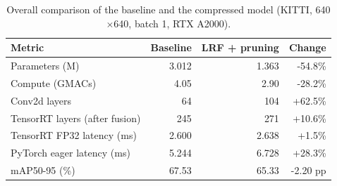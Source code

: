 \begin{table}[t]
\centering
\caption{Overall comparison of the baseline and the compressed model (KITTI, 640$\times$640, batch 1, RTX A2000).}
\label{tab:lrf_overall}
\begin{tabular}{lrrr}
\toprule
Metric & Baseline & LRF + pruning & Change \\
\midrule
Parameters (M) & 3.012 & 1.363 & -54.8\% \\
Compute (GMACs) & 4.05 & 2.90 & -28.2\% \\
Conv2d layers & 64 & 104 & +62.5\% \\
TensorRT layers (after fusion) & 245 & 271 & +10.6\% \\
TensorRT FP32 latency (ms) & 2.600 & 2.638 & +1.5\% \\
PyTorch eager latency (ms) & 5.244 & 6.728 & +28.3\% \\
mAP50-95 (\%) & 67.53 & 65.33 & -2.20 pp \\
\bottomrule
\end{tabular}
\end{table}

